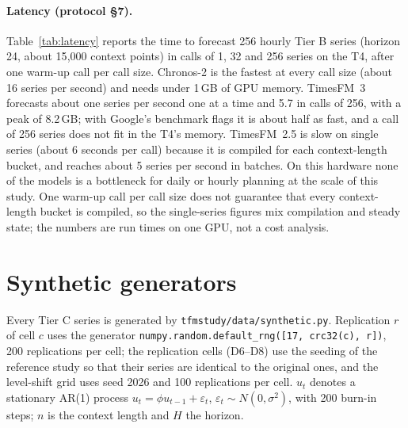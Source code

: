 \paragraph{Latency (protocol \S{}7).} Table~\ref{tab:latency} reports the time to forecast 256 hourly Tier B series (horizon 24,
about 15{,}000 context points) in calls of 1, 32 and 256 series on the T4, after one warm-up call per call size. Chronos-2 is the
fastest at every call size (about 16 series per second) and needs under 1\,GB of GPU memory. TimesFM~3 forecasts about one series
per second one at a time and 5.7 in calls of 256, with a peak of 8.2\,GB; with Google's benchmark flags it is about half as fast,
and a call of 256 series does not fit in the T4's memory. TimesFM~2.5 is slow on single series (about 6 seconds per call) because
it is compiled for each context-length bucket, and reaches about 5 series per second in batches. On this hardware none of the
models is a bottleneck for daily or hourly planning at the scale of this study. One warm-up call per call size does not
guarantee that every context-length bucket is compiled, so the single-series figures mix compilation and steady state; the
numbers are run times on one GPU, not a cost analysis.

\begin{table}[!htbp]
\centering
\caption{Latency on a Tesla T4 (fp32): seconds per call and series per second for calls of 1, 32 and 256 series (256 hourly
series, horizon 24), and peak GPU memory.}
\label{tab:latency}
\scriptsize
\setlength{\tabcolsep}{3.5pt}

\end{table}

\section{Synthetic generators}
\label{app:generators}

Every Tier C series is generated by \texttt{tfmstudy/data/synthetic.py}. Replication $r$ of cell $c$ uses the generator
\texttt{numpy.random.default\_rng([17, crc32(c), r])}, 200 replications per cell; the replication cells (D6--D8) use the seeding of the
reference study \citep{ebrahim2026foundation} so that their series are identical to the original ones, and the level-shift grid
uses seed 2026 and 100 replications per cell. $u_t$ denotes a stationary AR(1) process $u_t = \phi u_{t-1} + \varepsilon_t$,
$\varepsilon_t \sim N(0, \sigma^2)$, with 200 burn-in steps; $n$ is the context length and $H$ the horizon.

